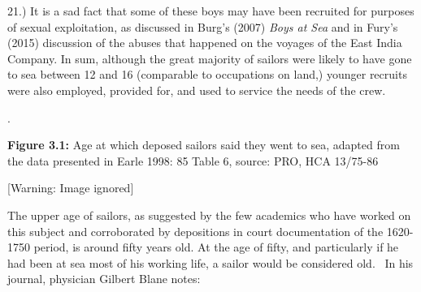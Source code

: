 \begin{styleStandard}
21.) It is a sad fact that some of these boys may have been recruited for purposes of sexual exploitation, as discussed in Burg’s (2007) \textit{Boys at Sea} and in Fury’s (2015) discussion of the abuses that happened on the voyages of the East India Company. In sum, although the great majority of sailors were likely to have gone to sea between 12 and 16 (comparable to occupations on land,) younger recruits were also employed, provided for, and used to service the needs of the crew.
\end{styleStandard}


\begin{styleStandard}
.
\end{styleStandard}


\begin{styleStandard}
\textbf{Figure 3.1:} Age at which deposed sailors said they went to sea, adapted from the data presented in Earle 1998: 85 Table 6, source: PRO, HCA 13/75-86
\end{styleStandard}


\begin{center}
 [Warning: Image ignored] %

\end{center}
\begin{styleStandard}
The upper age of sailors, as suggested by the few academics who have worked on this subject and corroborated by depositions in court documentation of the 1620-1750 period, is around fifty years old. At the age of fifty, and particularly if he had been at sea most of his working life, a sailor would be considered old. \ In his journal, physician Gilbert Blane notes:
\end{styleStandard}


